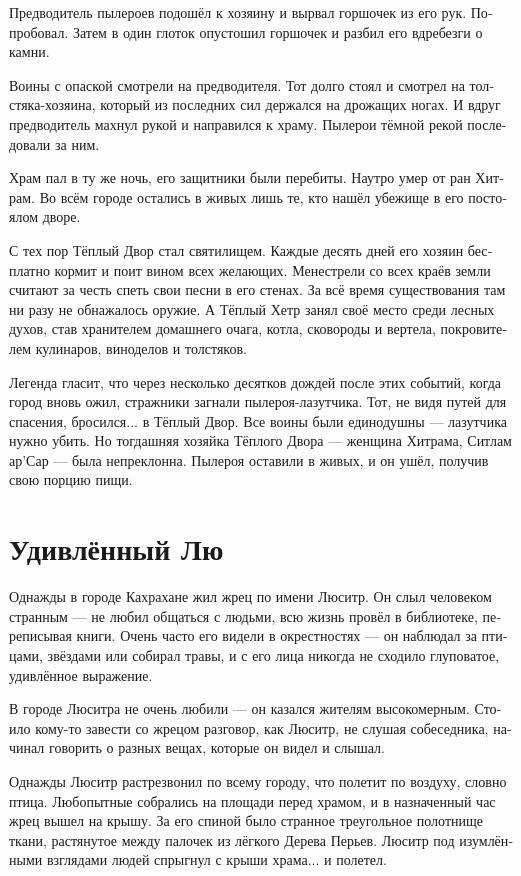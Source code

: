 \documentclass[a4paper,12pt,fleqn]{book}\usepackage{cooltooltips}\usepackage{polyglossia}\setdefaultlanguage[babelshorthands=true]{russian}\setotherlanguage{english}\defaultfontfeatures{Ligatures=TeX,Mapping=tex-text} \usepackage{xcolor}\definecolor{lightgray}{HTML}{bbbbbb}\color{lightgray}\newcommand{\ml}[3]{\textenglish{\textcolor{black}{#3}}}
\begin{document}
{Предводитель пылероев подошёл к хозяину и вырвал горшочек из его рук.
Попробовал.
Затем в один глоток опустошил горшочек и разбил его вдребезги о камни.

Воины с опаской смотрели на предводителя.
Тот долго стоял и смотрел на толстяка-хозяина, который из последних сил держался на дрожащих ногах.
И вдруг предводитель махнул рукой и направился к храму.
Пылерои тёмной рекой последовали за ним.

Храм пал в ту же ночь, его защитники были перебиты.
Наутро умер от ран Хитрам.
Во всём городе остались в живых лишь те, кто нашёл убежище в его постоялом дворе.

С тех пор Тёплый Двор стал святилищем.
Каждые десять дней его хозяин бесплатно кормит и поит вином всех желающих.
Менестрели со всех краёв земли считают за честь спеть свои песни в его стенах.
За всё время существования там ни разу не обнажалось оружие.
А Тёплый Хетр занял своё место среди лесных духов, став хранителем домашнего очага, котла, сковороды и вертела, покровителем кулинаров, виноделов и толстяков.

Легенда гласит, что через несколько десятков дождей после этих событий, когда город вновь ожил, стражники загнали пылероя-лазутчика.
Тот, не видя путей для спасения, бросился... в Тёплый Двор.
Все воины были единодушны --- лазутчика нужно убить. Но тогдашняя хозяйка Тёплого Двора --- женщина Хитрама, Ситлам ар’Сар --- была непреклонна.
Пылероя оставили в живых, и он ушёл, получив свою порцию пищи.

\section{Удивлённый Лю}

Однажды в городе Кахрахане жил жрец по имени Люситр.
Он слыл человеком странным --- не любил общаться с людьми, всю жизнь провёл в библиотеке, переписывая книги.
Очень часто его видели в окрестностях --- он наблюдал за птицами, звёздами или собирал травы, и с его лица никогда не сходило глуповатое, удивлённое выражение.

В городе Люситра не очень любили --- он казался жителям высокомерным.
Стоило кому-то завести со жрецом разговор, как Люситр, не слушая собеседника, начинал говорить о разных вещах, которые он видел и слышал.

Однажды Люситр растрезвонил по всему городу, что полетит по воздуху, словно птица.
Любопытные собрались на площади перед храмом, и в назначенный час жрец вышел на крышу.
За его спиной было странное треугольное полотнище ткани, растянутое между палочек из лёгкого Дерева Перьев.
Люситр под изумлёнными взглядами людей спрыгнул с крыши храма... и полетел.

}
\end{document}
